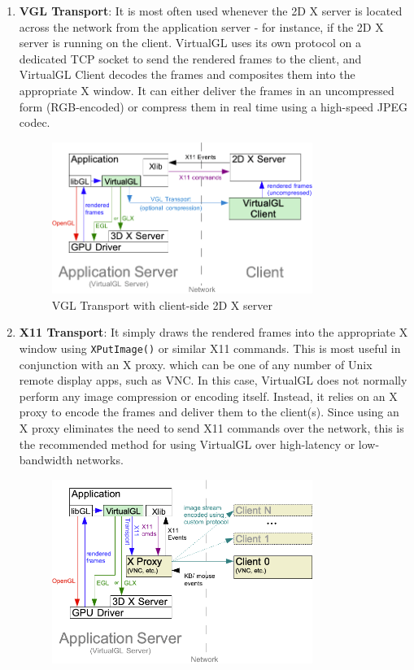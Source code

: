\documentclass[a4paper,12pt, final]{report}
\begin{document}
\begin{enumerate}
    \item \textbf{VGL Transport}: It is most often used whenever the 2D X server is located across the network from the application server - for instance, if the 2D X server is running on the client. VirtualGL uses its own protocol on a dedicated TCP socket to send the rendered frames to the client, and VirtualGL Client decodes the frames and composites them into the appropriate X window. It can either deliver the frames in an uncompressed form (RGB-encoded) or compress them in real time using a high-speed JPEG codec.\\
        \begin{figure}[H]
            \centering
            \includegraphics[width=0.8\textwidth]{images/vgltransport.png}
            \caption{VGL Transport with client-side 2D X server \cite{virtualgl_userguide}}
            \label{fig:vgl_transport}
        \end{figure}
    \item \textbf{X11 Transport}: It simply draws the rendered frames into the appropriate X window using \verb|XPutImage()| or similar X11 commands. This is most useful in conjunction with an X proxy. which can be one of any number of Unix remote display apps, such as VNC. In this case, VirtualGL does not normally perform any image compression or encoding itself. Instead, it relies on an X proxy to encode the frames and deliver them to the client(s). Since using an X proxy eliminates the need to send X11 commands over the network, this is the recommended method for using VirtualGL over high-latency or low-bandwidth networks.\\
        \begin{figure}[H]
            \centering
            \includegraphics[width=0.8\textwidth]{images/x11transport.png}

\end{figure}
\end{enumerate}
\end{document}
